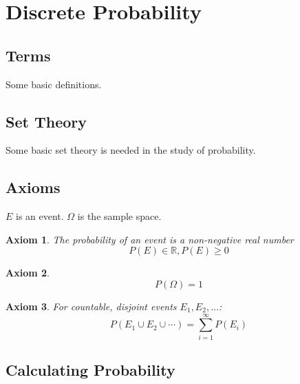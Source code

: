 \documentclass{article}
\newtheorem{axiom}{Axiom}
\begin{document}
% 

\section{Discrete Probability}

\subsection{Terms}
Some basic definitions.

\subsection{Set Theory}
Some basic set theory is needed in the study of probability.

\subsection{Axioms}
$E$ is an event. $\Omega$ is the sample space.
\begin{axiom} \label{axiom1}
The probability of an event is a non-negative real number
$$
P(E) \in \mathbb{R}, P(E) \geq 0
$$
\end{axiom}

\begin{axiom} \label{axiom2}
$$
P(\Omega) = 1
$$
\end{axiom}

\begin{axiom} \label{axiom3}
For countable, disjoint events $E_1,E_2,\ldots$:
$$ 
P(E_1 \cup E_2 \cup \cdots) = \displaystyle \sum_{i=1}^{\infty} P(E_i)
$$
\end{axiom}

\subsection{Calculating Probability}
\end{document}
